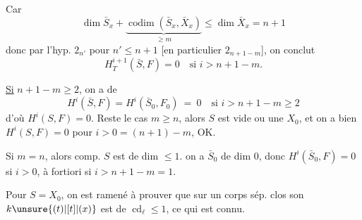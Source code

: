  Car 
\[
\dim\bar S_x+\underbrace{\operatorname{codim}(\bar S_x,\bar X_x)}_{\geq m}\leq\dim\bar X_x=n+1
\]
donc par l'hyp.  $2_{n'}$ pour $n'\leq n+1$
[en particulier $2_{n+1-m}$], on conclut
\[
H_T^{i+1}(\bar S,F)=0\quad\text{si }i>n+1-m.
\]

\uline{Si} $n+1-m\geq2$,  on a de \unsure{$=$}
\[
H^i(\bar S,F)=H^i(\bar S_0,F_0)\ =\ 0\quad\text{si }i>n+1-m\geq2
\]
d'où $H^i(S,F)=0$. Reste le cas
$m\geq n$,    alors $S$ est 
vide ou une   $X_0$, et on a
bien $H^i(S,F)=0$ pour $i>0=(n+1)-m$, OK.

Si $m=n$, alors   comp.
 $S$ est de dim $\leq1$.   on a $\bar S_0$ de dim 0, donc
$H^i(\bar S_0,F)=0$ si $i>0$, à fortiori si $i>n+1-m=1$.

Pour $S=X_0$, on est ramené à prouver
que sur un corps sép. clos \unsure{$k$, ]} son $k\unsure{(t)|[t]|(x)}$ est de  $\operatorname{cd}_{\ell}\leq1$,
ce qui est connu.
